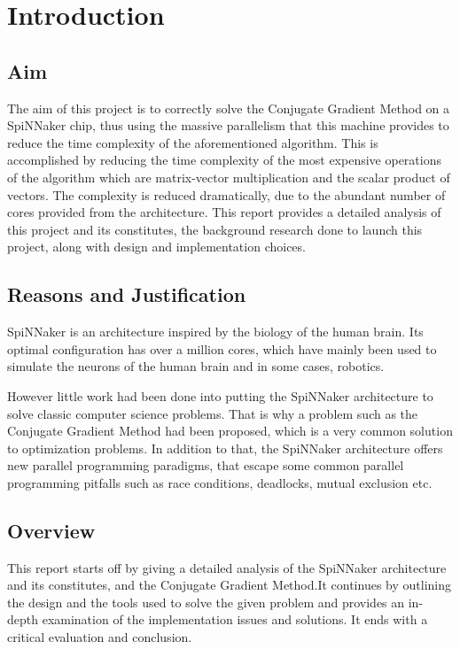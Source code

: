 \documentclass[12pt,a4paper]{article}
\begin{document}
\section{Introduction}
\subsection{Aim}
The aim of this project is to correctly solve the Conjugate Gradient Method\cite{hestenes1952methods} on a SpiNNaker chip, thus using the massive parallelism that this machine provides to reduce the time complexity of the aforementioned algorithm. This is accomplished by reducing the time complexity of the most expensive operations of the algorithm which are matrix-vector multiplication and the scalar product of vectors. The complexity is reduced dramatically, due to the abundant number of cores provided from the architecture. This report provides a detailed analysis of this project and its constitutes, the background research done to launch this project, along with design and implementation choices.
\subsection{Reasons and Justification}
\indent
SpiNNaker is an architecture inspired by the biology of the human brain. Its optimal configuration has over a million cores\cite{navaridas2009understanding}, which have mainly been used to simulate the neurons of the human brain and in some cases, robotics.

However little work had been done into putting the SpiNNaker architecture to solve classic computer science problems. That is why a problem such as the Conjugate Gradient Method had been proposed, which is a very common solution to optimization problems. In addition to that, the SpiNNaker architecture offers new parallel programming paradigms, that escape some common parallel programming pitfalls such as race conditions, deadlocks, mutual exclusion etc\cite{sharp2011event}.
\subsection{Overview}
This report starts off by giving a detailed analysis of the SpiNNaker architecture and its constitutes, and the Conjugate Gradient Method.It continues by outlining the design and the tools used to solve the given problem and provides an in-depth examination of the implementation issues and solutions. It ends with a critical evaluation and conclusion.
\newpage
\end{document}
